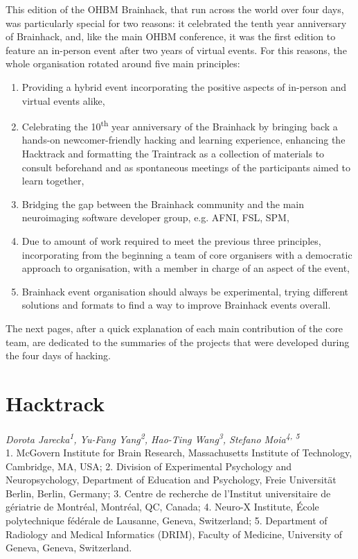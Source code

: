 \documentclass[10pt,a4paper,twocolumns]{proc}
\newcommand{\authors}[1]{\emph{\footnotesize #1} \\}
\newcommand{\affiliations}[1]{{\scriptsize #1} \\}
\begin{document}
This edition of the OHBM Brainhack, that run across the world over four
days, was particularly special for two reasons: it celebrated the tenth
year anniversary of Brainhack, and, like the main OHBM conference, it
was the first edition to feature an in-person event after two years of
virtual events. For this reasons, the whole organisation rotated around
five main principles:

\begin{enumerate}
\tightlist
\item
  Providing a hybrid event incorporating the positive aspects of
  in-person and virtual events alike,
\item
  Celebrating the 10\textsuperscript{th} year anniversary of the
  Brainhack by bringing back a hands-on newcomer-friendly hacking and
  learning experience, enhancing the Hacktrack and formatting the
  Traintrack as a collection of materials to consult beforehand and as
  spontaneous meetings of the participants aimed to learn together,
\item
  Bridging the gap between the Brainhack community and the main
  neuroimaging software developer group, e.g. AFNI, FSL, SPM,
\item
  Due to amount of work required to meet the previous three principles,
  incorporating from the beginning a team of core organisers with a
  democratic approach to organisation, with a member in charge of an
  aspect of the event,
\item
  Brainhack event organisation should always be experimental, trying
  different solutions and formats to find a way to improve Brainhack
  events overall. 
\end{enumerate}

The next pages, after a quick explanation of each main contribution of
the core team, are dedicated to the summaries of the projects that were
developed during the four days of hacking.

\section{Hacktrack}

\authors{Dorota Jarecka\textsuperscript{1}, %
Yu-Fang Yang\textsuperscript{2}, %
Hao-Ting Wang\textsuperscript{3}, %
Stefano Moia\textsuperscript{4, 5}}
%
\affiliations{1. McGovern Institute for Brain Research, Massachusetts Institute of Technology, Cambridge, MA, USA; %
2. Division of Experimental Psychology and Neuropsychology, Department of Education and Psychology, Freie Universität Berlin, Berlin, Germany; %
3. Centre de recherche de l'Institut universitaire de gériatrie de Montréal, Montréal, QC, Canada; %
4. Neuro-X Institute, École polytechnique fédérale de Lausanne, Geneva, Switzerland; %
5. Department of Radiology and Medical Informatics (DRIM), Faculty of Medicine, University of Geneva, Geneva, Switzerland.}
\end{document}
